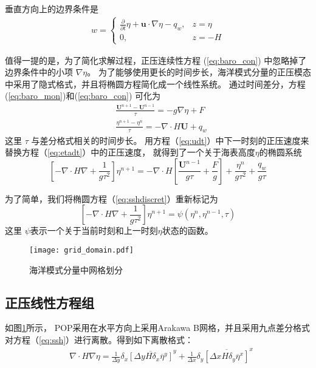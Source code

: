 垂直方向上的边界条件是
\begin{align}
\label{eq:bound_w}
w = \left\{ \begin{array}{ll}
\frac{\partial}{\partial t} \eta  +\textbf{u}\cdot\nabla \eta - q_w, & z = \eta  \\
0, & z = -H
\end{array} \right.
\end{align}
 
值得一提的是，为了简化求解过程，正压连续性方程 (\ref{eq:baro_con}) 中忽略掉了边界条件中的小项 $\nabla \eta$\cite{smith2010parallel}。
为了能够使用更长的时间步长，海洋模式分量的正压模态中采用了隐式格式，并且将椭圆方程简化成一个线性系统。 通过时间差分，方程  (\ref{eq:baro_mon})和(\ref{eq:baro_con}) 可化为
\begin{align}
&\displaystyle \frac{ \textbf{U}^{n+1} - \textbf{U}^{n-1}}{\tau}  = -g \nabla \eta + F \label{eq:udt} \\
&\displaystyle \frac{\eta^{n+1} - \eta^n }{\tau}  = - \nabla \cdot H\textbf{U} + q_w \label{eq:etadt}
\end{align}
这里 $\tau$ 与差分格式相关的时间步长。 
用方程（\ref{eq:udt}）中下一时刻的正压速度来替换方程（\ref{eq:etadt}）中的正压速度， 就得到了一个关于海表高度$\eta$的椭圆系统
\begin{equation}
\label{eq:sshdiscret}
     [-\nabla\cdot H \nabla + \frac{1}{g  \tau^2}]\eta^{n+1}
           = -\nabla\cdot H[\frac{\textbf{U}^{n-1}}{g \tau} + \frac{F}{g}] + \frac{\eta^n}{g\tau^2} +\frac{q_w}{g\tau}
\end{equation}
 
为了简单，我们将椭圆方程（\ref{eq:sshdiscret}）重新标记为
\begin{equation}
\label{eq:ssh}
[-\nabla \cdot H\nabla +\frac{1}{g  \tau^2}]\eta^{n+1} = \psi(\eta^n,\eta^{n-1},\tau)
\end{equation}
这里 $\psi$表示一个关于当前时刻和上一时刻$\eta$状态的函数。
 

\begin{figure}%
\centering
\texttt{[image: grid\_domain.pdf]}
\caption[] {海洋模式分量中网格划分\label{fig:grid1}}
\end{figure}


 

\subsection{正压线性方程组}
\label{solver:baroproperty}

如图\ref{fig:grid1}所示， POP采用在水平方向上采用Arakawa B网格\cite{smith2010parallel}，并且采用九点差分格式对方程（\ref{eq:ssh}）进行离散。得到如下离散格式：
\begin{align}
    & \nabla\cdot H \nabla \eta  =\frac{1}{\Delta y}\delta_x \overline{[\Delta y H  \delta_x\overline{\eta}^y]}^y +\frac{1}{\Delta x}\delta_y \overline{[\Delta x H  \delta_y\overline{\eta}^x]}^x \label{eq:nabla2}
  \end{align}

